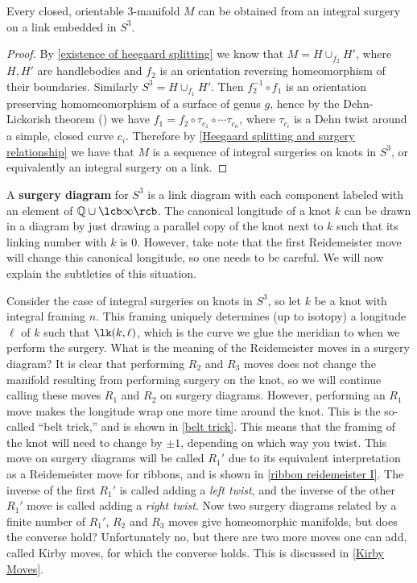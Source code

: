 \begin{thm}
\label{Lickorish-Wallace theorem}
Every closed, orientable 3-manifold $M$ can be obtained from an integral surgery on a link embedded in $S^3$.
\end{thm}
\begin{proof}
By \cref{existence of heegaard splitting} we know that $M = H \cup_{f_2} H'$, where $H,H'$ are handlebodies and $f_2$ is an orientation reversing homeomorphism of their boundaries. Similarly $S^3 = H \cup_{f_1} H'$. Then $f_2^{-1} \circ f_1$ is an orientation preserving homomeomorphism of a surface of genus $g$, hence by the Dehn-Lickorish theorem () we have $f_1 = f_2 \circ \tau_{c_1} \circ \cdots \tau_{c_n}$, where $\tau_{c_i}$ is a Dehn twist around a simple, closed curve $c_i$. Therefore by \cref{Heegaard splitting and surgery relationship} we have that $M$ is a sequence of integral surgeries on knots in $S^3$, or equivalently an integral surgery on a link.
\end{proof}

A \textbf{surgery diagram} for $S^3$ is a link diagram with each component labeled with an element of $\mathbb Q \cup \lcb \infty \rcb$. The canonical longitude of a knot $k$ can be drawn in a diagram by just drawing a parallel copy of the knot next to $k$ such that its linking number with $k$ is 0. However, take note that the first Reidemeister move will change this canonical longitude, so one needs to be careful. We will now explain the subtleties of this situation.

Consider the case of integral surgeries on knots in $S^3$, so let $k$ be a knot with integral framing $n$. This framing uniquely determines (up to isotopy) a longitude $\ell$ of $k$ such that $\lk(k,\ell)$, which is the curve we glue the meridian to when we perform the surgery. What is the meaning of the Reidemeister moves in a surgery diagram? It is clear that performing $R_2$ and $R_3$ moves does not change the manifold resulting from performing surgery on the knot, so we will continue calling these moves $R_1$ and $R_2$ on surgery diagrams. However, performing an $R_1$ move makes the longitude wrap one more time around the knot. This is the so-called ``belt trick,'' and is shown in \cref{belt trick}. This means that the framing of the knot will need to change by $\pm 1$, depending on which way you twist. This move on surgery diagrams will be called $R_1'$ due to its equivalent interpretation as a Reidemeister move for ribbons, and is shown in \cref{ribbon reidemeister I}. The inverse of the first $R_1'$ is called adding a \emph{left twist}, and the inverse of the other $R_1'$ move is called adding a \emph{right twist}. Now two surgery diagrams related by a finite number of $R_1'$, $R_2$ and $R_3$ moves give homeomorphic manifolds, but does the converse hold? Unfortunately no, but there are two more moves one can add, called Kirby moves, for which the converse holds. This is discussed in \cref{Kirby Moves}.

